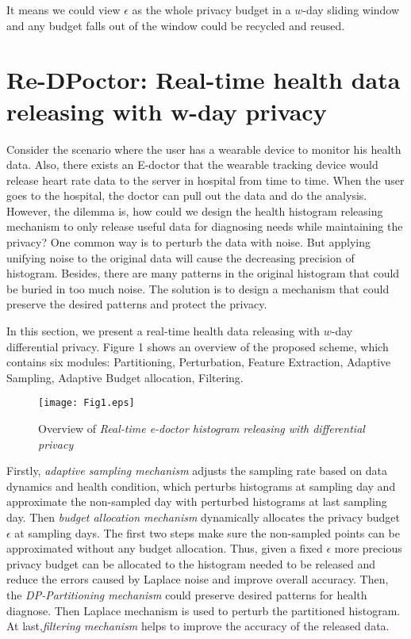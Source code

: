 \documentclass[10pt,conference]{IEEEtran}
\begin{document}
It means we could view $\epsilon$ as the whole privacy budget in a $w$-day sliding window and any budget falls out of the window could be recycled and reused.


\section{Re-DPoctor: Real-time health data releasing with w-day privacy}

Consider the scenario where the user has a wearable device to monitor his health data. Also, there exists an E-doctor that the wearable tracking device would release heart rate data to the server in hospital from time to time. When the user goes to the hospital, the doctor can pull out the data and do the analysis. However, the dilemma is, how could we design the health histogram releasing mechanism to only release useful data for diagnosing needs while maintaining the privacy? One common way is to perturb the data with noise. But applying unifying noise to the original data will cause the decreasing precision of histogram. Besides, there are many patterns in the original histogram that could be buried in too much noise. The solution is to design a mechanism that could preserve the desired patterns and protect the privacy.

In this section, we present a real-time health data releasing with $w$-day differential privacy. Figure 1 shows an overview of the proposed scheme, which contains six modules: Partitioning, Perturbation, Feature Extraction, Adaptive Sampling, Adaptive Budget allocation, Filtering. 

\begin{figure}[htb]
			\centerline{\texttt{[image: Fig1.eps]}}	
			\caption{Overview of \emph{Real-time e-doctor histogram releasing with differential privacy}}		
\end{figure}

Firstly, \emph{adaptive sampling mechanism} adjusts the sampling rate based on data dynamics and health condition, which perturbs histograms at sampling day and approximate the non-sampled day with perturbed histograms at last sampling day. Then \emph{budget allocation mechanism} dynamically allocates the privacy budget $\epsilon$ at sampling days. The first two steps make sure the non-sampled points can be approximated without any budget allocation. Thus, given a fixed $\epsilon$ more precious privacy budget can be allocated to the histogram needed to be released and reduce the errors caused by Laplace noise and improve overall accuracy. Then, the \emph{DP-Partitioning mechanism} could preserve desired patterns for health diagnose. Then Laplace mechanism is used to perturb the partitioned histogram. At last,\emph{filtering mechanism} helps to improve the accuracy of the released data.  
\end{document}
